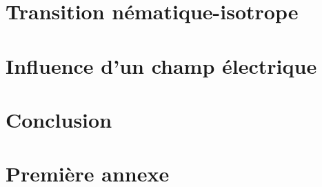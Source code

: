 \documentclass[11pt,a4paper]{article}
\numberwithin{equation}{section}
\begin{document}
\section{Transition nématique-isotrope}




\newpage
\section{Influence d'un champ électrique}


\newpage
\section*{Conclusion}


\newpage
\appendix
\section{Première annexe} \label{annexe_fonctionnelles}


\newpage

 
\end{document}
